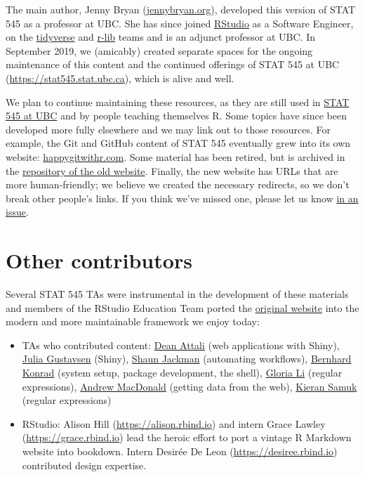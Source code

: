 \documentclass[
]{book}
\providecommand{\tightlist}{%
  \setlength{\itemsep}{0pt}\setlength{\parskip}{0pt}}
\begin{document}
The main author, Jenny Bryan (\href{https://jennybryan.org}{jennybryan.org}), developed this version of STAT 545 as a professor at UBC. She has since joined \href{https://www.rstudio.com/}{RStudio} as a Software Engineer, on the \href{https://www.tidyverse.org/}{tidyverse} and \href{https://github.com/r-lib/}{r-lib} teams and is an adjunct professor at UBC. In September 2019, we (amicably) created separate spaces for the ongoing maintenance of this content and the continued offerings of STAT 545 at UBC (\url{https://stat545.stat.ubc.ca}), which is alive and well.

We plan to continue maintaining these resources, as they are still used in \href{https://stat545.stat.ubc.ca}{STAT 545 at UBC} and by people teaching themselves R. Some topics have since been developed more fully elsewhere and we may link out to those resources. For example, the Git and GitHub content of STAT 545 eventually grew into its own website: \href{https://happygitwithr.com}{happygitwithr.com}. Some material has been retired, but is archived in the \href{https://github.com/STAT545-UBC/STAT545-UBC-original-website}{repository of the old website}. Finally, the new website has URLs that are more human-friendly; we believe we created the necessary redirects, so we don't break other people's links. If you think we've missed one, please let us know \href{https://github.com/rstudio-education/stat545/issues}{in an issue}.

\hypertarget{other-contributors}{%
\section*{Other contributors}\label{other-contributors}}

Several STAT 545 TAs were instrumental in the development of these materials and members of the RStudio Education Team ported the \href{https://github.com/STAT545-UBC/STAT545-UBC-original-website}{original website} into the modern and more maintainable framework we enjoy today:

\begin{itemize}
\tightlist
\item
  TAs who contributed content: \href{http://deanattali.com/}{Dean Attali} (web applications with Shiny), \href{https://www.juliagustavsen.com}{Julia Gustavsen} (Shiny), \href{http://sjackman.ca}{Shaun Jackman} (automating workflows), \href{https://twitter.com/BernhardKonrad}{Bernhard Konrad} (system setup, package development, the shell), \href{https://twitter.com/LuolanLi}{Gloria Li} (regular expressions), \href{https://twitter.com/polesasunder}{Andrew MacDonald} (getting data from the web), \href{https://ksamuk.github.io}{Kieran Samuk} (regular expressions)
\item
  RStudio: Alison Hill (\url{https://alison.rbind.io}) and intern Grace Lawley (\url{https://grace.rbind.io}) lead the heroic effort to port a vintage R Markdown website into bookdown. Intern Desirée De Leon (\url{https://desiree.rbind.io}) contributed design expertise.
\end{itemize}
\end{document}
